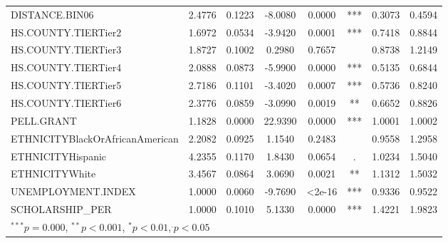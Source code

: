 \documentclass[12pt,english]{report}
\begin{document}
\begin{table}[H]
\begin{adjustbox}{width=0.95\textwidth}
\begin{tabular}{|lccccccc|}
DISTANCE.BIN06                  & 2.4776   & 0.1223     & -8.0080 & 0.0000     & ***         & 0.3073 & 0.4594 \\
HS.COUNTY.TIERTier2             & 1.6972   & 0.0534     & -3.9420 & 0.0001     & ***         & 0.7418 & 0.8844 \\
HS.COUNTY.TIERTier3             & 1.8727   & 0.1002     & 0.2980  & 0.7657     &             & 0.8738 & 1.2149 \\
HS.COUNTY.TIERTier4             & 2.0888   & 0.0873     & -5.9900 & 0.0000     & ***         & 0.5135 & 0.6844 \\
HS.COUNTY.TIERTier5             & 2.7186   & 0.1101     & -3.4020 & 0.0007     & ***         & 0.5736 & 0.8240 \\
HS.COUNTY.TIERTier6             & 2.3776   & 0.0859     & -3.0990 & 0.0019     & **          & 0.6652 & 0.8826 \\
PELL.GRANT     & 1.1828   & 0.0000     & 22.9390 & 0.0000     & ***& 1.0001 & 1.0002 \\
ETHNICITYBlackOrAfricanAmerican & 2.2082   & 0.0925     & 1.1540  & 0.2483     &             & 0.9558 & 1.2958 \\
ETHNICITYHispanic               & 4.2355   & 0.1170     & 1.8430  & 0.0654     & .           & 1.0234 & 1.5040 \\
ETHNICITYWhite                  & 3.4567   & 0.0864     & 3.0690  & 0.0021     & **          & 1.1312 & 1.5032 \\
UNEMPLOYMENT.INDEX              & 1.0000   & 0.0060     & -9.7690 & \textless2e-16     & ***         & 0.9336 & 0.9522 \\
SCHOLARSHIP\_PER                & 1.0000   & 0.1010     & 5.1330  & 0.0000     & ***         & 1.4221 & 1.9823    \\
\hline %
\multicolumn{7}{l}{\scriptsize{$^{***} p=0.000$, $^{**} p<0.001$, $^*p<0.01$,$^{.}p<0.05$}}

\end{tabular}
\end{adjustbox}
\end{table}
\end{document}
